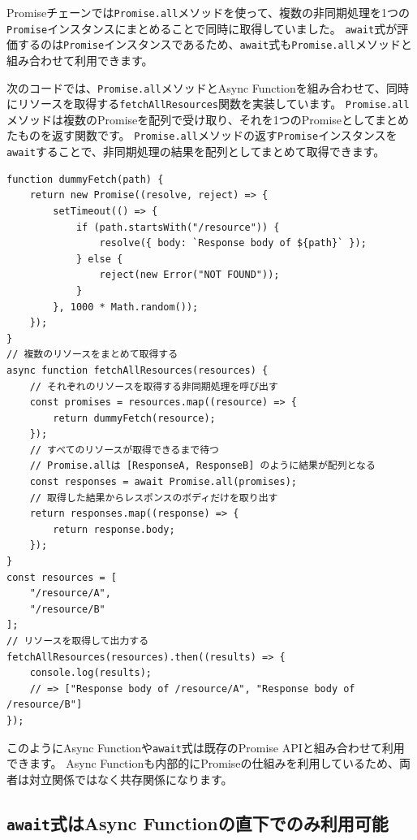 Promiseチェーンでは\texttt{Promise.all}メソッドを使って、複数の非同期処理を1つの\texttt{Promise}インスタンスにまとめることで同時に取得していました。
\texttt{await}式が評価するのは\texttt{Promise}インスタンスであるため、\texttt{await}式も\texttt{Promise.all}メソッドと組み合わせて利用できます。

次のコードでは、\texttt{Promise.all}メソッドとAsync
Functionを組み合わせて、同時にリソースを取得する\texttt{fetchAllResources}関数を実装しています。
\texttt{Promise.all}メソッドは複数のPromiseを配列で受け取り、それを1つのPromiseとしてまとめたものを返す関数です。
\texttt{Promise.all}メソッドの返す\texttt{Promise}インスタンスを\texttt{await}することで、非同期処理の結果を配列としてまとめて取得できます。

\begin{lstlisting}
function dummyFetch(path) {
    return new Promise((resolve, reject) => {
        setTimeout(() => {
            if (path.startsWith("/resource")) {
                resolve({ body: `Response body of ${path}` });
            } else {
                reject(new Error("NOT FOUND"));
            }
        }, 1000 * Math.random());
    });
}
// 複数のリソースをまとめて取得する
async function fetchAllResources(resources) {
    // それぞれのリソースを取得する非同期処理を呼び出す
    const promises = resources.map((resource) => {
        return dummyFetch(resource);
    });
    // すべてのリソースが取得できるまで待つ
    // Promise.allは [ResponseA, ResponseB] のように結果が配列となる
    const responses = await Promise.all(promises);
    // 取得した結果からレスポンスのボディだけを取り出す
    return responses.map((response) => {
        return response.body;
    });
}
const resources = [
    "/resource/A",
    "/resource/B"
];
// リソースを取得して出力する
fetchAllResources(resources).then((results) => {
    console.log(results); 
    // => ["Response body of /resource/A", "Response body of /resource/B"]
});
\end{lstlisting}

このようにAsync
Functionや\texttt{await}式は既存のPromise
APIと組み合わせて利用できます。 Async
Functionも内部的にPromiseの仕組みを利用しているため、両者は対立関係ではなく共存関係になります。

\hypertarget{await-in-async-function}{%
\subsection{\texorpdfstring{\texttt{await}式はAsync
Functionの直下でのみ利用可能}{await式はAsync Functionの直下でのみ利用可能}}\label{await-in-async-function}}

